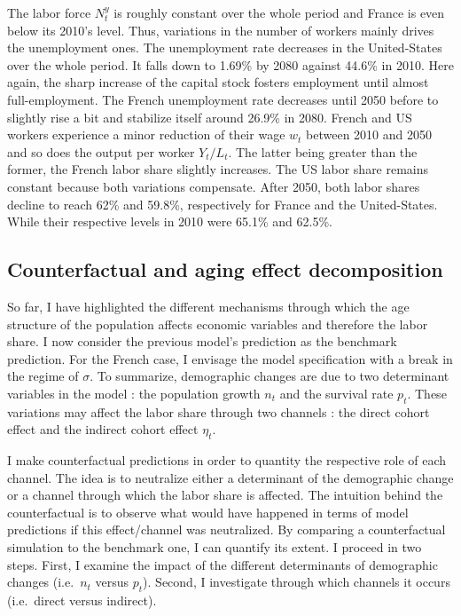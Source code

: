 \documentclass[
]{article}
\begin{document}
The labor force \(N^y_t\) is roughly constant over the whole period and France is even below its 2010's level. Thus, variations in the number of workers mainly drives the unemployment ones. The unemployment rate decreases in the United-States over the whole period. It falls down to 1.69\% by 2080 against 44.6\% in 2010. Here again, the sharp increase of the capital stock fosters employment until almost full-employment. The French unemployment rate decreases until 2050 before to slightly rise a bit and stabilize itself around 26.9\% in 2080.
French and US workers experience a minor reduction of their wage \(w_t\) between 2010 and 2050 and so does the output per worker \(Y_t/L_t\). The latter being greater than the former, the French labor share slightly increases. The US labor share remains constant because both variations compensate. After 2050, both labor shares decline to reach 62\% and 59.8\%, respectively for France and the United-States. While their respective levels in 2010 were 65.1\% and 62.5\%.

\hypertarget{counterfactual}{%
\subsection{Counterfactual and aging effect decomposition}\label{counterfactual}}

So far, I have highlighted the different mechanisms through which the age structure of the population affects economic variables and therefore the labor share. I now consider the previous model's prediction as the benchmark prediction. For the French case, I envisage the model specification with a break in the regime of \(\sigma\). To summarize, demographic changes are due to two determinant variables in the model : the population growth \(n_t\) and the survival rate \(p_t\). These variations may affect the labor share through two channels : the direct cohort effect and the indirect cohort effect \(\eta_t\).

I make counterfactual predictions in order to quantity the respective role of each channel. The idea is to neutralize either a determinant of the demographic change or a channel through which the labor share is affected. The intuition behind the counterfactual is to observe what would have happened in terms of model predictions if this effect/channel was neutralized. By comparing a counterfactual simulation to the benchmark one, I can quantify its extent. I proceed in two steps. First, I examine the impact of the different determinants of demographic changes (i.e.~\(n_t\) versus \(p_t\)). Second, I investigate through which channels it occurs (i.e.~direct versus indirect).
\end{document}
